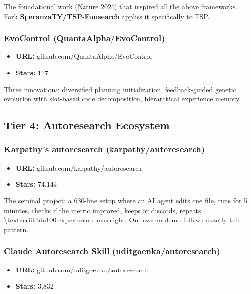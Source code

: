 \documentclass[twocolumn,10pt,letterpaper]{article}
\begin{document}
The foundational work (Nature 2024) that inspired all the above frameworks. Fork \textbf{SperanzaTY/TSP-Funsearch} applies it specifically to TSP.


\subsubsection{EvoControl (QuantaAlpha/EvoControl)}

\begin{itemize}
\setlength{\itemsep}{0pt}
\setlength{\parskip}{0pt}
  \item \textbf{URL:} github.com/QuantaAlpha/EvoControl
  \item \textbf{Stars:} 117
\end{itemize}

Three innovations: diversified planning initialization, feedback-guided genetic evolution with slot-based code decomposition, hierarchical experience memory.


\subsection{Tier 4: Autoresearch Ecosystem}

\subsubsection{Karpathy's autoresearch (karpathy/autoresearch)}

\begin{itemize}
\setlength{\itemsep}{0pt}
\setlength{\parskip}{0pt}
  \item \textbf{URL:} github.com/karpathy/autoresearch
  \item \textbf{Stars:} 74,144
\end{itemize}

The seminal project: a 630-line setup where an AI agent edits one file, runs for 5 minutes, checks if the metric improved, keeps or discards, repeats. \textbackslash{}textasciitilde100 experiments overnight. Our swarm demo follows exactly this pattern.


\subsubsection{Claude Autoresearch Skill (uditgoenka/autoresearch)}

\begin{itemize}
\setlength{\itemsep}{0pt}
\setlength{\parskip}{0pt}
  \item \textbf{URL:} github.com/uditgoenka/autoresearch
  \item \textbf{Stars:} 3,832
\end{itemize}
\end{document}
